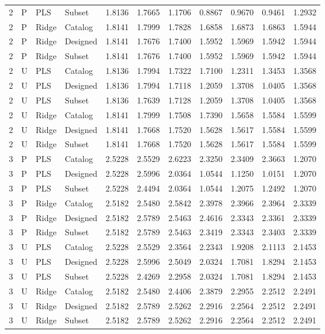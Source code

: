 \documentclass[10pt,a4paper]{article}
\begin{document}
\begin{longtable}{rlllrrrrrrr}
2 & P & PLS & Subset & 1.8136 & 1.7665 & 1.1706 & 0.8867 & 0.9670 & 0.9461 & 1.2932 \\
2 & P & Ridge & Catalog & 1.8141 & 1.7999 & 1.7828 & 1.6858 & 1.6873 & 1.6863 & 1.5944 \\
2 & P & Ridge & Designed & 1.8141 & 1.7676 & 1.7400 & 1.5952 & 1.5969 & 1.5942 & 1.5944 \\
2 & P & Ridge & Subset & 1.8141 & 1.7676 & 1.7400 & 1.5952 & 1.5969 & 1.5942 & 1.5944 \\
2 & U & PLS & Catalog & 1.8136 & 1.7994 & 1.7322 & 1.7100 & 1.2311 & 1.3453 & 1.3568 \\
2 & U & PLS & Designed & 1.8136 & 1.7994 & 1.7118 & 1.2059 & 1.3708 & 1.0405 & 1.3568 \\
2 & U & PLS & Subset & 1.8136 & 1.7639 & 1.7128 & 1.2059 & 1.3708 & 1.0405 & 1.3568 \\
2 & U & Ridge & Catalog & 1.8141 & 1.7999 & 1.7508 & 1.7390 & 1.5658 & 1.5584 & 1.5599 \\
2 & U & Ridge & Designed & 1.8141 & 1.7668 & 1.7520 & 1.5628 & 1.5617 & 1.5584 & 1.5599 \\
2 & U & Ridge & Subset & 1.8141 & 1.7668 & 1.7520 & 1.5628 & 1.5617 & 1.5584 & 1.5599 \\
3 & P & PLS & Catalog & 2.5228 & 2.5529 & 2.6223 & 2.3250 & 2.3409 & 2.3663 & 1.2070 \\
3 & P & PLS & Designed & 2.5228 & 2.5996 & 2.0364 & 1.0544 & 1.1250 & 1.0151 & 1.2070 \\
3 & P & PLS & Subset & 2.5228 & 2.4494 & 2.0364 & 1.0544 & 1.2075 & 1.2492 & 1.2070 \\
3 & P & Ridge & Catalog & 2.5182 & 2.5480 & 2.5842 & 2.3978 & 2.3966 & 2.3964 & 2.3339 \\
3 & P & Ridge & Designed & 2.5182 & 2.5789 & 2.5463 & 2.4616 & 2.3343 & 2.3361 & 2.3339 \\
3 & P & Ridge & Subset & 2.5182 & 2.5789 & 2.5463 & 2.3419 & 2.3343 & 2.3403 & 2.3339 \\
3 & U & PLS & Catalog & 2.5228 & 2.5529 & 2.3564 & 2.2343 & 1.9208 & 2.1113 & 2.1453 \\
3 & U & PLS & Designed & 2.5228 & 2.5996 & 2.5049 & 2.0324 & 1.7081 & 1.8294 & 2.1453 \\
3 & U & PLS & Subset & 2.5228 & 2.4269 & 2.2958 & 2.0324 & 1.7081 & 1.8294 & 2.1453 \\
3 & U & Ridge & Catalog & 2.5182 & 2.5480 & 2.4406 & 2.3879 & 2.2955 & 2.2512 & 2.2491 \\
3 & U & Ridge & Designed & 2.5182 & 2.5789 & 2.5262 & 2.2916 & 2.2564 & 2.2512 & 2.2491 \\
3 & U & Ridge & Subset & 2.5182 & 2.5789 & 2.5262 & 2.2916 & 2.2564 & 2.2512 & 2.2491 \\
\end{longtable}
\endgroup
\end{document}
